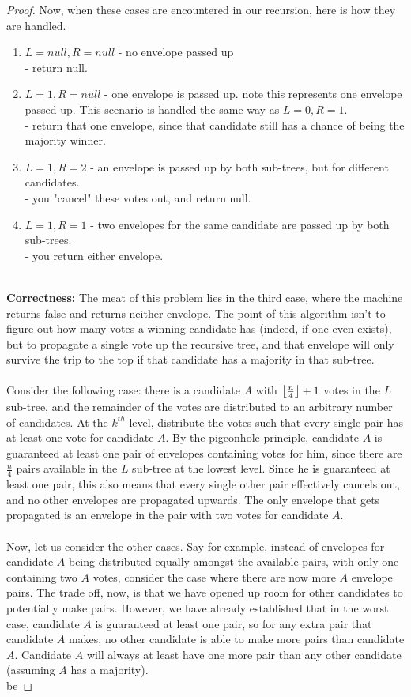 \documentclass[11pt]{article}
\DeclarePairedDelimiter\floor{\lfloor}{\rfloor}
\begin{document}
\begin{proof}
Now, when these cases are encountered in our recursion, here is how they are handled.
\begin{enumerate}
\item $L = null, R = null$ - no envelope passed up\\
	- return null.
\item $L = 1, R = null$ - one envelope is passed up. note this represents one envelope passed up. This scenario is handled the same way as $L = 0, R = 1$.\\
	- return that one envelope, since that candidate still has a chance of being the majority winner.
\item $L = 1, R = 2$ - an envelope is passed up by both sub-trees, but for different candidates.\\
	- you "cancel" these votes out, and return null.
\item $L = 1, R = 1$ - two envelopes for the same candidate are passed up by both sub-trees.\\
	- you return either envelope.\\\\
\end{enumerate}
\textbf{Correctness:}
The meat of this problem lies in the third case, where the machine returns false and returns neither envelope. The point of this algorithm isn't to figure out how many votes a winning candidate has (indeed, if one even exists), but to propagate a single vote up the recursive tree, and that envelope will only survive the trip to the top if that candidate has a majority in that sub-tree.\\
\\
Consider the following case: there is a candidate $A$ with $\floor*{\frac{n}{4}} + 1$ votes in the $L$ sub-tree, and the remainder of the votes are distributed to an arbitrary number of candidates. At the $k^{th}$ level, distribute the votes such that every single pair has at least one vote for candidate $A$. By the pigeonhole principle, candidate $A$ is guaranteed at least one pair of envelopes containing votes for him, since there are ${\frac{n}{4}}$ pairs available in the $L$ sub-tree at the lowest level. Since he is guaranteed at least one pair, this also means that every single other pair effectively cancels out, and no other envelopes are propagated upwards. The only envelope that gets propagated is an envelope in the pair with two votes for candidate $A$.\\
\\
Now, let us consider the other cases. Say for example, instead of envelopes for candidate $A$ being distributed equally amongst the available pairs, with only one containing two $A$ votes, consider the case where there are now more $A$ envelope pairs. The trade off, now, is that we have opened up room for other candidates to potentially make pairs. However, we have already established that in the worst case, candidate $A$ is guaranteed at least one pair, so for any extra pair that candidate $A$ makes, no other candidate is able to make more pairs than candidate $A$. Candidate $A$ will always at least have one more pair than any other candidate (assuming $A$ has a majority).\\be

\end{proof}
\end{document}
